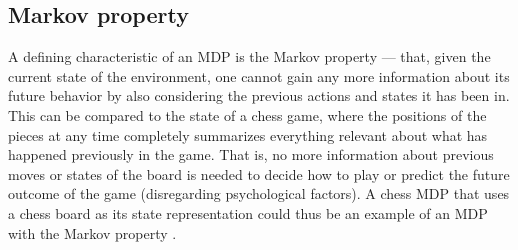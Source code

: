 \subsection{Markov property}

A defining characteristic of an MDP is the Markov property --- that, given the
current state of the environment, one cannot gain any more information about
its future behavior by also considering the previous actions and states it has
been in. This can be compared to the state of a chess game, where the positions
of the pieces at any time completely summarizes everything relevant about what
has happened previously in the game. That is, no more information about
previous moves or states of the board is needed to decide how to play or
predict the future outcome of the game (disregarding psychological factors). A
chess MDP that uses a chess board as its state representation could thus be an
example of an MDP with the Markov property \parencite{altman2002applications}. 
